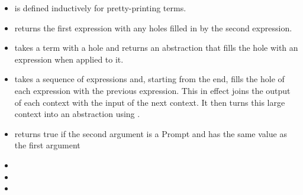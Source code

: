 \begin{itemize}\itemsep0.1cm

\item {} is defined inductively for pretty-printing terms.

\item {} returns the first expression with any holes filled in by the second expression.

\item {} takes a term with a hole and returns an abstraction that fills the hole with an expression when applied to it.

\item {} takes a sequence of expressions and, starting from the end, fills the hole of each expression with the previous expression. This in effect joins the output of each context with the input of the next context. It then turns this large context into an abstraction using .

\item {} returns true if the second argument is a Prompt and has the same value as the first argument

\item {} 
\item {}
\item {}

\end{itemize}

